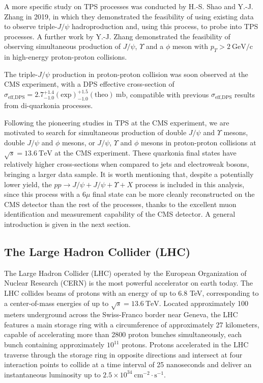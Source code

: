\documentclass[10pt,twocolumn]{article}
\newcommand*{\effXsecDPS}{\sigma_{\text{eff,DPS}}}
\newcommand*{\GeVc}{~\text{GeV/c}}
\begin{document}
A more specific study on TPS processes was conducted by H.-S. Shao and Y.-J. Zhang in 2019\cite{YJZ_TRI_JPSI}, in which they demonstrated the feasibility of using existing data to observe triple-$J/\psi$ hadroproduction and, using this process, to probe into TPS processes. A further work by Y.-J. Zhang demonstrated the feasibility of observing simultaneous production of $J/\psi$, $\Upsilon$ and a $\phi$ meson with $p_T > 2\GeVc$ in high-energy proton-proton collisions\cite{YJZ_MPS_REPORT}.

The triple-$J/\psi$ production in proton-proton collision was soon observed at the CMS experiment, with a DPS effective cross-section of $\effXsecDPS = 2.7^{+1.4}_{-1.0}(\text{exp})^{+1.5}_{-1.0}(\text{theo}) ~\text{mb}$, compatible with previous $\effXsecDPS$ results from di-quarkonia processes. 

Following the pioneering studies in TPS at the CMS experiment, we are motivated to search for simultaneous production of double $J/\psi$ and $\Upsilon$ mesons, double $J/\psi$ and $\phi$ mesons, or $J/\psi$, $\Upsilon$ and $\phi$ mesons in proton-proton collisions at $\sqrt{s} = 13.6 ~ \mathrm{TeV}$ at the CMS experiment. These quarkonia final states have relatively higher cross-sections when compared to jets and electroweak bosons, bringing a larger data sample. It is worth mentioning that, despite a potentially lower yield, the $pp\to J/\psi+J/\psi+\Upsilon+X$ process is included in this analysis, since this process with a 6$\mu$ final state can be more cleanly reconstructed on the CMS detector than the rest of the processes, thanks to the excellent muon identification and measurement capability of the CMS detector. A general introduction is given in the next section.

\subsection{The Large Hadron Collider (LHC)}

The Large Hadron Collider (LHC) operated by the European Organization of Nuclear Research (CERN) is the most powerful accelerator on earth today. The LHC collides beams of protons with an energy of up to 6.8 TeV, corresponding to a center-of-mass energies of up to $\sqrt{s}=13.6~\mathrm{TeV}$. Located approximately 100 meters underground across the Swiss-Franco border near Geneva, the LHC features a main storage ring with a circumference of approximately 27 kilometers, capable of accelerating more than 2800 proton bunches simultaneously, each bunch containing approximately $10^11$ protons. Protons accelerated in the LHC traverse through the storage ring in opposite directions and intersect at four interaction points to collide at a time interval of 25 nanoseconds and deliver an instantaneous luminosity up to $2.5\times 10^{34} ~\text{cm}^{-2}\cdot\text{s}^{-1}$\cite{CMS:LUMI-PUB}.
\end{document}
